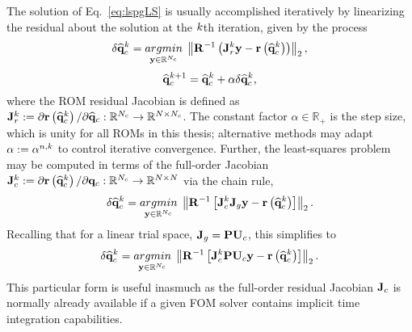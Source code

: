 The solution of Eq.~\ref{eq:lspgLS} is usually accomplished iteratively by linearizing the residual about the solution at the $k$th iteration, given by the process
%
\begin{equation}\label{eq:lspgLSLin}
    \delta \consVecCoef^{\newtonIdx} = \argmin{\dummyVec \inROne{\numConsModes}} \left\Vert \resScaleInv \left(\jacobRes^{\newtonIdx} \dummyVec - \resFunc{\consVecCoef^{\newtonIdx}}\right) \right\Vert_2,
\end{equation}
\begin{equation}
    \mathbf{\widehat{q}}_{c}^{k + 1} = \mathbf{\widehat{q}}_{c}^{k} + \alpha \delta \mathbf{\widehat{q}}_{c}^{k},
\end{equation}
%
where the ROM residual Jacobian is defined as $\mathbf{J}_{r}^{k} := \partial \mathbf{r}\left(\mathbf{\widehat{q}}_{c}^{k}\right) / \partial \mathbf{\widehat{q}}_{c}: \mathbb{R}^{N_c} \rightarrow \mathbb{R}^{N \times N_c}$. The constant factor $\alpha \in \mathbb{R}_+$ is the step size, which is unity for all ROMs in this thesis; alternative methods may adapt $\alpha := \alpha^{n,k}$ to control iterative convergence. Further, the least-squares problem may be computed in terms of the full-order Jacobian $\mathbf{J}_{c}^{k} := \partial \mathbf{r}\left(\mathbf{\widehat{q}}_{c}^{k}\right) / \partial \mathbf{q}_{c}: \mathbb{R}^{N_c} \rightarrow \mathbb{R}^{N \times N}$ via the chain rule,
%
\begin{equation}
    \delta \consVecCoef^{\newtonIdx} = \argmin{\dummyVec \inROne{\numConsModes}} \left\Vert \resScaleInv \left[\jacobCons^{\newtonIdx} \jacobDecode \dummyVec - \resFunc{\consVecCoef^{\newtonIdx}}\right] \right\Vert_2.
\end{equation}
%
Recalling that for a linear trial space, $\jacobDecode = \consScale \consTrial$, this simplifies to
%
\begin{equation}
    \delta \consVecCoef^{\newtonIdx} = \argmin{\dummyVec \inROne{\numConsModes}} \left\Vert \resScaleInv \left[\jacobCons^{\newtonIdx} \consScale \consTrial \dummyVec - \resFunc{\consVecCoef^{\newtonIdx}}\right] \right\Vert_2.
\end{equation}
%
This particular form is useful inasmuch as the full-order residual Jacobian $\mathbf{J}_{c}$ is normally already available if a given FOM solver contains implicit time integration capabilities.

